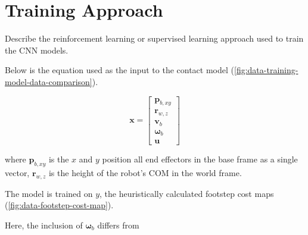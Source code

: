\section{Training Approach}

\begin{outline}
  Describe the reinforcement learning or supervised learning approach
  used to train the CNN models.
\end{outline}

Below is the equation used as the input to the contact model
(\autoref{fig:data-training-model-data-comparison}).

\[
  \mathbf{x} =
  \begin{bmatrix}
    \mathbf p_{b,xy} \\
    \mathbf r_{w,z} \\
    \mathbf v_b \\
    \mathbf \omega_b \\
    \mathbf u
  \end{bmatrix}
\]

where
$\mathbf p_{b,xy}$ is the $x$ and $y$ position all end effectors in
the base frame as a single vector,
$\mathbf r_{w,z}$ is the height of the robot's COM in the world frame.

The model is trained on $y$, the heuristically calculated footstep
cost maps (\autoref{fig:data-footstep-cost-map}).

Here, the inclusion of $\mathbf \omega_b$ differs from
\cite{bratta_contactnet_2024}

